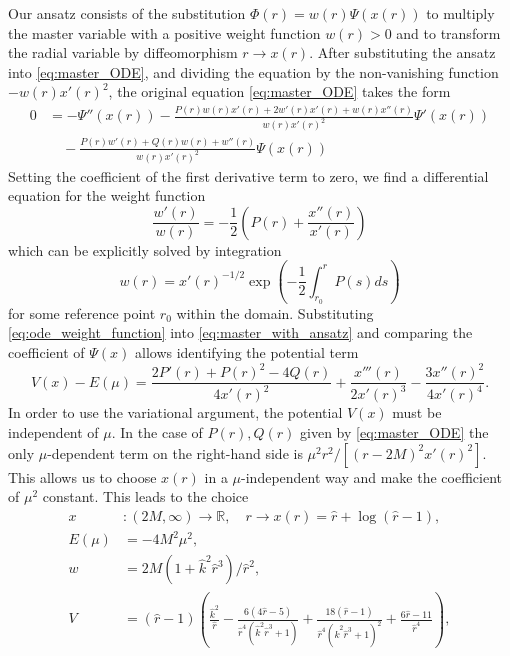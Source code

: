 \documentclass[11pt,aip,jmp,amsmath,amssymb,draft]{revtex4-1}
\begin{document}
Our ansatz consists of the substitution $\Phi(r) = w(r)\Psi(x(r))$ to multiply the master variable with a positive weight function $w(r) > 0$ and to transform the radial variable by diffeomorphism $r \to x(r)$.
After substituting the ansatz into \cref{eq:master_ODE}, and dividing the equation by the non-vanishing function $-w(r)x'(r)^2$, the original equation \cref{eq:master_ODE} takes the form
\begin{align} \label{eq:master_with_ansatz}
    0 &=-\Psi''(x(r))-\frac{P(r) w(r) x'(r)+2 w'(r) x'(r)+w(r) x''(r)}{w(r) x'(r)^2}\Psi'(x(r)) \nonumber \\ &\quad -\frac{P(r) w'(r)+Q(r) w(r)+w''(r)}{w(r) x'(r)^2}\Psi(x(r))
\end{align}
Setting the coefficient of the first derivative term to zero, we find a differential equation for the weight function
\begin{equation} \label{eq:ode_weight_function}
     \frac{w'(r)}{w(r)} = - \frac{1}{2}\left(P(r) + \frac{x''(r)}{x'(r)}\right)
\end{equation}
which can be explicitly solved by integration
\begin{equation} \label{eq:weight_function}
    w(r) = x'(r)^{-1/2}\exp\left(-\frac{1}{2}\int_{r_0}^r P(s) ds\right)
\end{equation}
for some reference point $r_0$ within the domain. Substituting \cref{eq:ode_weight_function} into \cref{eq:master_with_ansatz} and comparing the coefficient of $\Psi(x)$ allows identifying the potential term
\begin{equation}
    V(x) - E(\mu) = \frac{2 P'(r)+P(r)^2-4 Q(r)}{4 x'(r)^2}+\frac{x'''(r)}{2 x'(r)^3}-\frac{3 x''(r)^2}{4 x'(r)^4}.
\end{equation}
In order to use the variational argument, the potential $V(x)$ must be independent of $\mu$. In the case of $P(r),Q(r)$ given by \cref{eq:master_ODE} the only $\mu$-dependent term on the right-hand side is $\mu^2 r^2/\left[(r-2M)^2x'(r)^2\right]$. 
This allows us to choose $x(r)$ in a $\mu$-independent way and make the coefficient of $\mu^2$ constant. This leads to the choice
\begin{align}
    x&: (2M, \infty) \to \mathbb{R}, \quad r \to x(r) = \hat r + \log(\hat r - 1), \\
    E(\mu) &= -4M^2 \mu^2, \\
    w &= 2M (1+ \hat k^2 \hat r^3)/\hat r^2, \\
    V &= \left(\hat{r}-1\right) \left(\frac{\hat{k}^2}{\hat{r}}-\frac{6 \left(4 \hat{r}-5\right)}{\hat{r}^4 \left(\hat{k}^2 \hat{r}^3+1\right)}+\frac{18 \left(\hat{r}-1\right)}{\hat{r}^4 \left(\hat{k}^2 \hat{r}^3+1\right)^2}+\frac{6 \hat{r}-11}{\hat{r}^4}\right), \label{eq:potential}
\end{align}
\end{document}
